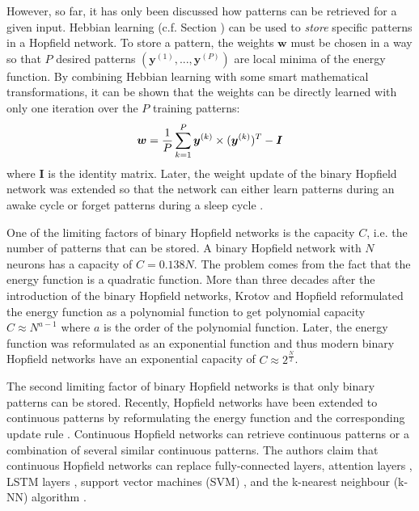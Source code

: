 However, so far, it has only been discussed how patterns can be retrieved for a given input.
Hebbian learning (c.f. Section ) can be used to \emph{store} specific patterns in a Hopfield network.
To store a pattern, the weights \(\boldsymbol{w}\) must be chosen in a way so that $P$ desired patterns \((\boldsymbol{y}^{(1)}, ..., \boldsymbol{y}^{(P)})\) are local minima of the energy function.
By combining Hebbian learning with some smart mathematical transformations, it can be shown that the weights can be directly learned with only one iteration over the $P$ training patterns:
%
\begin{align}\eqlbl{hf_5}
	\boldsymbol{w} = \frac{1}{P} \sum_{k=1}^{P} \boldsymbol{y}^{(k)} \times (\boldsymbol{y}^{(k)})^T - \boldsymbol{I}
\end{align}
%
where \(\boldsymbol{I}\) is the identity matrix.
Later, the weight update of the binary Hopfield network was extended so that the network can either learn patterns during an awake cycle or forget patterns during a sleep cycle .

One of the limiting factors of binary Hopfield networks is the capacity $C$, i.e. the number of patterns that can be stored.
A binary Hopfield network with \(N\) neurons has a capacity of \(C=0.138N\).
The problem comes from the fact that the energy function is a quadratic function.
More than three decades after the introduction of the binary Hopfield networks, Krotov and Hopfield  reformulated the energy function as a polynomial function to get polynomial capacity \(C\approx N^{a-1}\) where \(a\) is the order of the polynomial function.
Later, the energy function was reformulated as an exponential function  and thus modern binary Hopfield networks have an exponential capacity of \(C\approx 2^{\frac{N}{2}}\).

The second limiting factor of binary Hopfield networks is that only binary patterns can be stored.
Recently, Hopfield networks have been extended to continuous patterns by reformulating the energy function and the corresponding update rule .
Continuous Hopfield networks can retrieve continuous patterns or a combination of several similar continuous patterns.
The authors claim that continuous Hopfield networks can replace fully-connected layers, attention layers \cite{10.5555/2969033.2969073}, LSTM layers \cite{Hochreiter_Schmidhuber_1997}, support vector machines (SVM) \cite{Cortes_Vapnik_1995}, and the k-nearest neighbour (k-NN) algorithm \cite{Cover_Hart_1967}.









